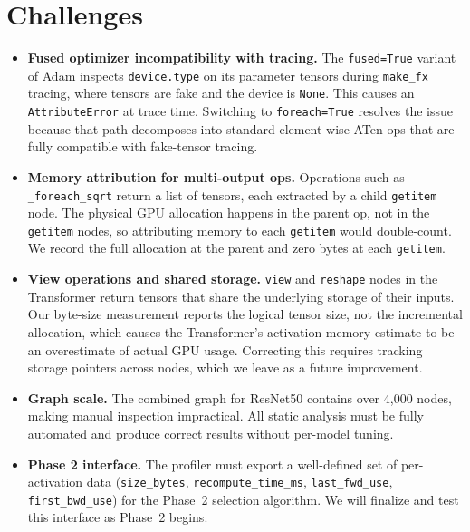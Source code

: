 \documentclass[11pt]{article}
\begin{document}
\section{Challenges}

\begin{itemize}[leftmargin=*]

  \item \textbf{Fused optimizer incompatibility with tracing.}
    The \texttt{fused=True} variant of Adam inspects \texttt{device.type}
    on its parameter tensors during \texttt{make\_fx} tracing, where
    tensors are fake and the device is \texttt{None}.
    This causes an \texttt{AttributeError} at trace time.
    Switching to \texttt{foreach=True} resolves the issue because that
    path decomposes into standard element-wise ATen ops that are fully
    compatible with fake-tensor tracing.

  \item \textbf{Memory attribution for multi-output ops.}
    Operations such as \texttt{\_foreach\_sqrt} return a list of tensors,
    each extracted by a child \texttt{getitem} node.
    The physical GPU allocation happens in the parent op, not in the
    \texttt{getitem} nodes, so attributing memory to each \texttt{getitem}
    would double-count.
    We record the full allocation at the parent and zero bytes at each
    \texttt{getitem}.

  \item \textbf{View operations and shared storage.}
    \texttt{view} and \texttt{reshape} nodes in the Transformer return
    tensors that share the underlying storage of their inputs.
    Our byte-size measurement reports the logical tensor size, not the
    incremental allocation, which causes the Transformer's activation
    memory estimate to be an overestimate of actual GPU usage.
    Correcting this requires tracking storage pointers across nodes, which
    we leave as a future improvement.

  \item \textbf{Graph scale.}
    The combined graph for ResNet50 contains over 4,000 nodes, making
    manual inspection impractical.
    All static analysis must be fully automated and produce correct
    results without per-model tuning.

  \item \textbf{Phase 2 interface.}
    The profiler must export a well-defined set of per-activation data
    (\texttt{size\_bytes}, \texttt{recompute\_time\_ms},
    \texttt{last\_fwd\_use}, \texttt{first\_bwd\_use}) for the Phase~2
    selection algorithm.
    We will finalize and test this interface as Phase~2 begins.

\end{itemize}
\end{document}
